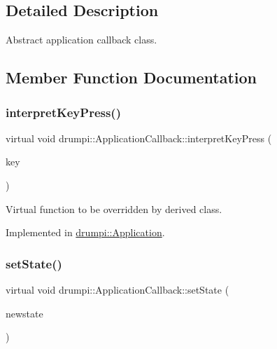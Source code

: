 \subsection{Detailed Description}
Abstract application callback class. 

\subsection{Member Function Documentation}
\mbox{\label{classdrumpi_1_1ApplicationCallback_ab3f7606af20b435e8d2db240155c02d1}} 
\subsubsection{\texorpdfstring{interpret\+Key\+Press()}{interpretKeyPress()}}
{\footnotesize\ttfamily virtual void drumpi\+::\+Application\+Callback\+::interpret\+Key\+Press (\begin{DoxyParamCaption}\item[{int}]{key }\end{DoxyParamCaption})\hspace{0.3cm}{\ttfamily [pure virtual]}}

Virtual function to be overridden by derived class. 

Implemented in \hyperlink{classdrumpi_1_1Application_af9f0221f37ccb5e324599554ac5ceadf}{drumpi\+::\+Application}.

\mbox{\label{classdrumpi_1_1ApplicationCallback_a009f5eb3ef1d4d3ee339ba3d1c6c52cf}} 
\subsubsection{\texorpdfstring{set\+State()}{setState()}}
{\footnotesize\ttfamily virtual void drumpi\+::\+Application\+Callback\+::set\+State (\begin{DoxyParamCaption}\item[{\hyperlink{namespacedrumpi_af70ab0854d65f24f7fa353fdc1c46bc9}{state\+Label\+\_\+t}}]{newstate }\end{DoxyParamCaption})\hspace{0.3cm}{\ttfamily [pure virtual]}}


